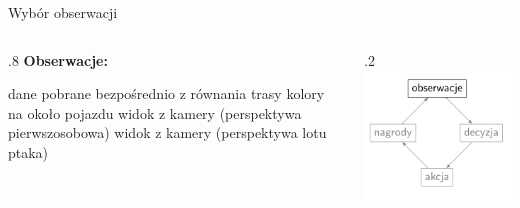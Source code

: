 \begin{frame}{Wybór obserwacji}
	
	\begin{columns}
		\begin{column}{.8\hsize}
			\textbf{Obserwacje:}
			\begin{itemize}
				\myitem dane pobrane bezpośrednio z równania trasy
				\myitem kolory na około pojazdu
				\myitem widok z kamery (perspektywa pierwszosobowa)
				\myitem widok z kamery (perspektywa lotu ptaka)
			\end{itemize}
			\vspace{1cm}
		\end{column}
		
		\begin{column}{.2\hsize}
			\includegraphics[width=\linewidth]{figures/learning_loop_1.png}
			\vspace{2cm}
		\end{column}
	\end{columns}


\end{frame}
